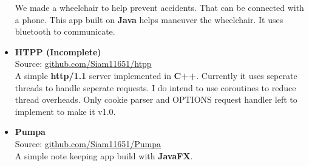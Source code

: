 \begin{itemize}
{    We made a wheelchair to help prevent accidents. That can be connected with a phone. This app built on \textbf{Java} helps maneuver the wheelchair. It uses bluetooth to communicate.
  }
  \item {
    \textbf{HTPP (Incomplete)} \\
    Source: \href{https://github.com/Siam11651/htpp}{github.com/Siam11651/htpp} \\
    A simple \textbf{http/1.1} server implemented in \textbf{C++}. Currently it uses seperate threads to handle seperate requests. I do intend to use coroutines to reduce thread overheads. Only cookie parser and OPTIONS request handler left to implement to make it v1.0.
  }
  \item {
    \textbf{Pumpa} \\
    Source: \href{https://github.com/Siam11651/Pumpa}{github.com/Siam11651/Pumpa} \\
    A simple note keeping app build with \textbf{JavaFX}.
  }
\end{itemize}